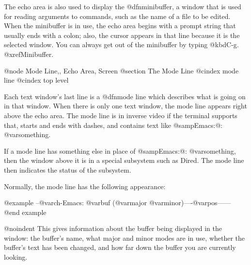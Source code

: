   The echo area is also used to display the @dfn{minibuffer}, a window that
is used for reading arguments to commands, such as the name of a file to be
edited.  When the minibuffer is in use, the echo area begins with a prompt
string that usually ends with a colon; also, the cursor appears in that line
because it is the selected window.  You can always get out of the
minibuffer by typing @kbd{C-g}.  @xref{Minibuffer}.

@node Mode Line,, Echo Area, Screen
@section The Mode Line
@cindex mode line
@cindex top level

  Each text window's last line is a @dfn{mode line} which describes what is
going on in that window.  When there is only one text window, the mode line
appears right above the echo area.  The mode line is in inverse video if
the terminal supports that, starts and ends with dashes, and contains text
like @samp{Emacs:@: @var{something}}.

  If a mode line has something else in place of @samp{Emacs:@: @var{something}},
then the window above it is in a special subsystem such as Dired.  The mode
line then indicates the status of the subsystem.

  Normally, the mode line has the following appearance:

@example
--@var{ch}-Emacs: @var{buf}      (@var{major} @var{minor})----@var{pos}------
@end example

@noindent
This gives information about the buffer being displayed in the window: the
buffer's name, what major and minor modes are in use, whether the buffer's
text has been changed, and how far down the buffer you are currently
looking.

